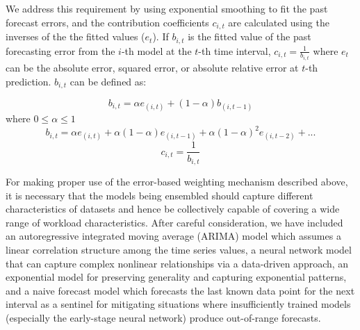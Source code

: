 We address this requirement by using exponential smoothing to fit the past forecast errors, and the contribution coefficients $c_{i,t}$ are calculated using the inverses of the the fitted values ($e_{t}$). If $b_{i,t}$ is the fitted value of the past forecasting error from the $i$-th model at the $t$-th time interval, $c_{i,t}=\frac{1}{b_{i,t}}$ where $e_{t}$ can be the absolute error, squared error, or absolute relative error at $t$-th prediction. $b_{i,t}$ can be defined as:

\begin{equation} \label{eq:1}
b_{i,t}= \alpha e_{(i,t)} + (1-\alpha)b_{(i,t-1)}
\end{equation}
where $0\leq \alpha \leq 1$
\begin{equation}\nonumber
b_{i,t}=\alpha e_{(i,t)} + \alpha(1-\alpha)e_{(i,t-1)}+\alpha(1-\alpha)^2e_{(i,t-2)}+ . ..  
\end{equation}
\begin{equation}
c_{i,t}=\frac{1}{b_{i,t}} 
\end{equation}

For making proper use of the error-based weighting mechanism described above, it is necessary that the models being ensembled should capture different characteristics of datasets and hence be collectively capable of covering a wide range of workload characteristics. After careful consideration, we have included an autoregressive integrated moving average (ARIMA) model which assumes a linear correlation structure among the time series values, a neural network model that can capture complex nonlinear relationships via a data-driven approach, an exponential model for preserving generality and capturing exponential patterns, and a naive forecast model which forecasts the last known data point for the next interval as a sentinel for mitigating situations where insufficiently trained models (especially the early-stage neural network) produce out-of-range forecasts.